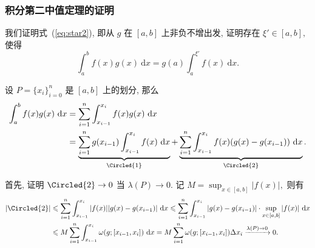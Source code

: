 
\begin{frame}
\frametitle{积分第二中值定理的证明}

\startproof[bg=yellow, fg=red]
我们证明式~(\ref{eq:star2}), 即从 $g$ 在 $[a, b]$ 上非负不增出发, 证明存在 $\xi' \in [a, b],$ 使得
\[
\int_a^b f(x) g(x) ~ \mathrm{d} x = g(a) \int_a^{\xi'} f(x) ~ \mathrm{d} x.
\]

设 $P = \{ x_i \}_{i=0}^n$ 是 $[a, b]$ 上的划分, 那么
\begin{align*}
\int_a^b f(x) g(x) ~ \mathrm{d} x & = \sum_{i=1}^n \int_{x_{i-1}}^{x_i} f(x) g(x) ~ \mathrm{d} x \\
& = \underbrace{\sum_{i=1}^n g(x_{i-1}) \int_{x_{i-1}}^{x_i} f(x) ~ \mathrm{d} x}_{\Circled{1}} + \underbrace{\sum_{i=1}^n \int_{x_{i-1}}^{x_i} f(x) (g(x) - g(x_{i-1})) ~ \mathrm{d} x}_{\Circled{2}}.
\end{align*}

\pause

首先, 证明 $\Circled{2} \to 0$ 当 $\lambda(P) \to 0.$ 记 $M = \sup_{x \in [a, b]} |f(x)|,$ 则有
\begin{align*}
|\Circled{2}| & \leqslant \sum_{i=1}^n \int_{x_{i-1}}^{x_i} |f(x)| |g(x) - g(x_{i-1})| ~ \mathrm{d} x \leqslant \sum_{i=1}^n \int_{x_{i-1}}^{x_i} |g(x) - g(x_{i-1})| \cdot \sup_{x \in [a, b]} |f(x)| ~ \mathrm{d} x \\
& \leqslant M \sum_{i=1}^n \int_{x_{i-1}}^{x_i} \omega(g; [x_{i-1}, x_i]) ~ \mathrm{d} x = M \sum_{i=1}^n \omega(g; [x_{i-1}, x_i]) \Delta x_i \xrightarrow{\lambda(P) \to 0} 0.
\end{align*}

\end{frame}


